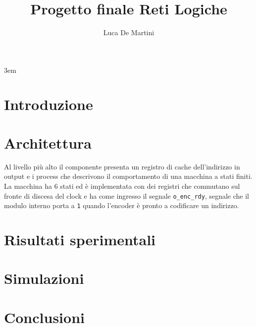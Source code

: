 \documentclass[a4paper,twocolumn]{article}
\title{Progetto finale Reti Logiche}
\author{Luca De Martini}
\date{}
\begin{document}
\emergencystretch 3em

\maketitle
    
\section{Introduzione}

\section{Architettura}
Al livello più alto il componente presenta un registro di cache dell'indirizzo in output e i process che descrivono il comportamento di una macchina a stati finiti.
La macchina ha 6 stati ed è implementata con dei registri che commutano sul fronte di discesa del clock e ha come ingresso il segnale \texttt{o_enc_rdy}, segnale che il modulo interno porta a \texttt{1} quando l'encoder è pronto a codificare un indirizzo. 
\section{Risultati sperimentali}

\section{Simulazioni}

\section{Conclusioni}

\end{document}
